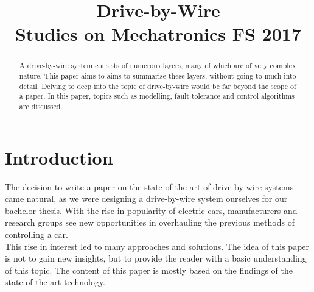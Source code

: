 \documentclass[conference]{IEEEtran}
\begin{document}
\title{
Drive-by-Wire
\\[0.5cm]
\large{Studies on Mechatronics FS 2017}
}

\author{
\and

}

\maketitle

\setlength\parindent{0pt}
\newcommand{\spn}[1]{\textsc{Span} \left\{ #1 \right\}}
\newcommand{\dimension}[1]{\textsc{dim} \left\{ #1 \right\}}
\newcommand{\real}[1]{\textsc{Re} \left( #1 \right)}
\newcommand{\imag}[1]{\textsc{Im} \left( #1 \right)}
\newcommand{\DET}[1]{\textsc{Det} \left[ #1 \right]}
\newcommand*\rfrac[2]{{}^{#1}\!/_{#2}}


\thispagestyle{plain}
\pagestyle{plain}

\begin{abstract}
A drive-by-wire system consists of numerous layers, many of which are of very complex nature. This paper aims to aims to summarise these layers, without going to much into detail. Delving to deep into the topic of drive-by-wire would be far beyond the scope of a paper. In this paper, topics such as modelling, fault tolerance and control algorithms are discussed. 
\end{abstract}


\section{Introduction}

The decision to write a paper on the state of the art of drive-by-wire systems came natural, as we were designing a drive-by-wire system ourselves for our bachelor thesis. With the rise in popularity of electric cars, manufacturers and research groups see new opportunities in overhauling the previous methods of controlling a car.\\
This rise in interest led to many approaches and solutions. The idea of this paper is not to gain new insights, but to provide the reader with a basic understanding of this topic. The content of this paper is mostly based on the findings of the state of the art technology.
\end{document}
